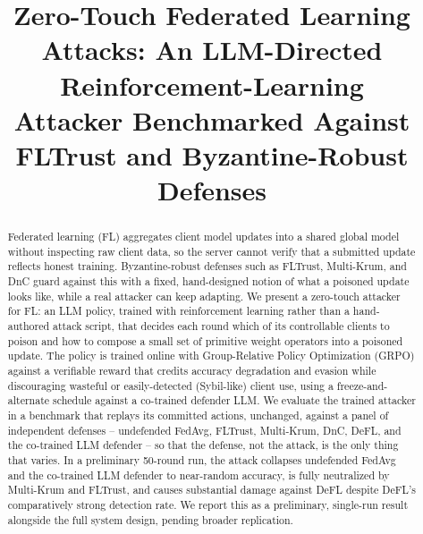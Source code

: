 \documentclass[conference]{IEEEtran}
\begin{document}
\title{Zero-Touch Federated Learning Attacks: An LLM-Directed Reinforcement-Learning\\ Attacker Benchmarked Against FLTrust and Byzantine-Robust Defenses}

\author{
\and
{}
}

\maketitle

\begin{abstract}
Federated learning (FL) aggregates client model updates into a shared global model without inspecting raw client data, so the server cannot verify that a submitted update reflects honest training. Byzantine-robust defenses such as FLTrust, Multi-Krum, and DnC guard against this with a fixed, hand-designed notion of what a poisoned update looks like, while a real attacker can keep adapting. We present a zero-touch attacker for FL: an LLM policy, trained with reinforcement learning rather than a hand-authored attack script, that decides each round which of its controllable clients to poison and how to compose a small set of primitive weight operators into a poisoned update. The policy is trained online with Group-Relative Policy Optimization (GRPO) against a verifiable reward that credits accuracy degradation and evasion while discouraging wasteful or easily-detected (Sybil-like) client use, using a freeze-and-alternate schedule against a co-trained defender LLM. We evaluate the trained attacker in a benchmark that replays its committed actions, unchanged, against a panel of independent defenses -- undefended FedAvg, FLTrust, Multi-Krum, DnC, DeFL, and the co-trained LLM defender -- so that the defense, not the attack, is the only thing that varies. In a preliminary 50-round run, the attack collapses undefended FedAvg and the co-trained LLM defender to near-random accuracy, is fully neutralized by Multi-Krum and FLTrust, and causes substantial damage against DeFL despite DeFL's comparatively strong detection rate. We report this as a preliminary, single-run result alongside the full system design, pending broader replication.
\end{abstract}
\end{document}
